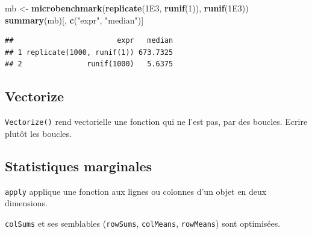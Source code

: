 \documentclass[
  12pt,
  french,
  a4paper,
  extrafontsizes,onecolumn,openright
  ]{memoir}
\newenvironment{Shaded}{\begin{snugshade}}{\end{snugshade}}
\newcommand{\DecValTok}[1]{\textcolor[rgb]{0.00,0.00,0.81}{#1}}
\newcommand{\FloatTok}[1]{\textcolor[rgb]{0.00,0.00,0.81}{#1}}
\newcommand{\FunctionTok}[1]{\textcolor[rgb]{0.13,0.29,0.53}{\textbf{#1}}}
\newcommand{\NormalTok}[1]{#1}
\newcommand{\OtherTok}[1]{\textcolor[rgb]{0.56,0.35,0.01}{#1}}
\newcommand{\StringTok}[1]{\textcolor[rgb]{0.31,0.60,0.02}{#1}}
\begin{document}
\scriptsize

\begin{Shaded}
\begin{Highlighting}[]
\NormalTok{mb }\OtherTok{\textless{}{-}} \FunctionTok{microbenchmark}\NormalTok{(}\FunctionTok{replicate}\NormalTok{(}\FloatTok{1E3}\NormalTok{, }\FunctionTok{runif}\NormalTok{(}\DecValTok{1}\NormalTok{)), }\FunctionTok{runif}\NormalTok{(}\FloatTok{1E3}\NormalTok{))}
\FunctionTok{summary}\NormalTok{(mb)[, }\FunctionTok{c}\NormalTok{(}\StringTok{"expr"}\NormalTok{, }\StringTok{"median"}\NormalTok{)]}
\end{Highlighting}
\end{Shaded}

\begin{verbatim}
##                        expr   median
## 1 replicate(1000, runif(1)) 673.7325
## 2               runif(1000)   5.6375
\end{verbatim}

\normalsize

\subsection{Vectorize}\label{vectorize}

\texttt{Vectorize()} rend vectorielle une fonction qui ne l'est pas, par des boucles.
Ecrire plutôt les boucles.

\subsection{Statistiques marginales}\label{statistiques-marginales}

\texttt{apply} applique une fonction aux lignes ou colonnes d'un objet en deux dimensions.

\texttt{colSums} et ses semblables (\texttt{rowSums}, \texttt{colMeans}, \texttt{rowMeans}) sont optimisées.

\scriptsize
\end{document}
